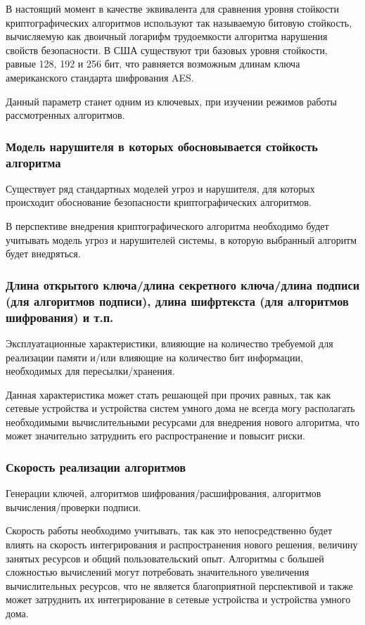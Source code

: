 В настоящий момент в качестве эквивалента для сравнения уровня стойкости криптографических алгоритмов используют так называемую битовую стойкость, вычисляемую как двоичный логарифм трудоемкости алгоритма нарушения свойств безопасности. В США существуют три базовых уровня стойкости, равные 128, 192 и 256 бит, что равняется возможным длинам ключа американского стандарта шифрования AES\cite{Security_Evaluation_Criteria}. 

Данный параметр станет одним из ключевых, при изучении режимов работы рассмотренных алгоритмов.

\subsubsection{Модель нарушителя в которых обосновывается стойкость алгоритма}
Существует ряд стандартных моделей угроз и нарушителя, для которых происходит обоснование безопасности криптографических алгоритмов. 

В перспективе внедрения криптографического алгоритма необходимо будет учитывать модель угроз и нарушителей системы, в которую выбранный алгоритм будет внедряться.

\subsubsection{Длина открытого ключа/длина секретного ключа/длина подписи (для алгоритмов подписи), длина шифртекста (для алгоритмов шифрования) и т.п.}
Эксплуатационные характеристики, влияющие на количество требуемой для реализации памяти и/или влияющие на количество бит информации, необходимых для пересылки/хранения.

Данная характеристика может стать решающей при прочих равных, так как сетевые устройства и устройства систем умного дома не всегда могу располагать необходимыми вычислительными ресурсами для внедрения нового алгоритма, что может значительно затруднить его распространение и повысит риски.

\subsubsection{Скорость реализации алгоритмов}
Генерации ключей, алгоритмов шифрования/расшифрования, алгоритмов вычисления/проверки подписи.

Скорость работы необходимо учитывать, так как это непосредственно будет влиять на скорость интегрирования и распространения нового решения, величину занятых ресурсов и общий пользовательский опыт. Алгоритмы с большей сложностью вычислений могут потребовать значительного увеличения вычислительных ресурсов, что не является благоприятной перспективой и также может затруднить их интегрирование в сетевые устройства и устройства умного дома.